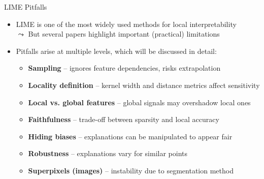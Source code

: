 \documentclass[10pt,compress,t,notes=noshow, xcolor=table]{beamer}
\begin{document}
\begin{frame}{LIME Pitfalls}
  \begin{itemize}
  	\item %
  	LIME is one of the most widely used methods for local interpretability\\ 
  	$\leadsto$ But several papers highlight important (practical) limitations
  	\item Pitfalls arise at multiple levels, which will be discussed in detail:
    \begin{itemize}
  \item \textbf{Sampling} -- ignores feature dependencies, risks extrapolation
  \item \textbf{Locality definition} -- kernel width and distance metrics affect sensitivity
  \item \textbf{Local vs. global features} -- global signals may overshadow local ones
  \item \textbf{Faithfulness} -- trade-off between sparsity and local accuracy
  \item \textbf{Hiding biases} -- explanations can be manipulated to appear fair
  \item \textbf{Robustness} -- explanations vary for similar points
  \item \textbf{Superpixels (images)} -- instability due to segmentation method
\end{itemize}
  \end{itemize}
  
\end{frame}
  
\end{document}
